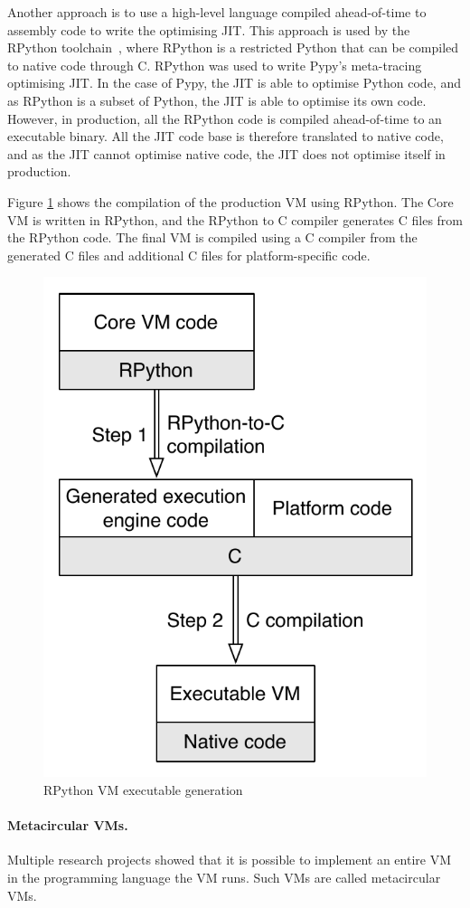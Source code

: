 \documentclass[a4paper,12pt,twoside]{../includes/ThesisStyle}
\begin{document}
Another approach is to use a high-level language compiled ahead-of-time to assembly code to write the optimising JIT. This approach is used by the RPython toolchain~\cite{Rigo06a}, where RPython is a restricted Python that can be compiled to native code through C. RPython was used to write Pypy's meta-tracing optimising JIT. In the case of Pypy, the JIT is able to optimise Python code, and as RPython is a subset of Python, the JIT is able to optimise its own code. However, in production, all the RPython code is compiled ahead-of-time to an executable binary. All the JIT code base is therefore translated to native code, and as the JIT cannot optimise native code, the JIT does not optimise itself in production.

Figure \ref{fig:RPythonVMCompilation} shows the compilation of the production VM using RPython. The Core VM is written in RPython, and the RPython to C compiler generates C files from the RPython code. The final VM is compiled using a C compiler from the generated C files and additional C files for platform-specific code.

\begin{figure}[h!]
    \begin{center}
        \includegraphics[width=0.45\linewidth]{RPythonVMCompilation}
        \caption{RPython VM executable generation}
        \label{fig:RPythonVMCompilation}
    \end{center}
\end{figure}

\paragraph{Metacircular VMs.} Multiple research projects showed that it is possible to implement an entire VM in the programming language the VM runs. Such VMs are called metacircular VMs. 
\end{document}
